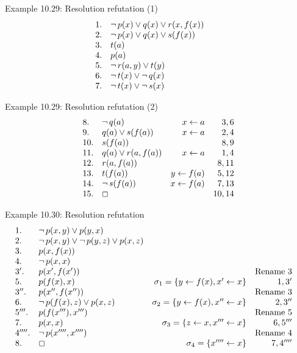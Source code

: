 \documentclass[style=simple,size=12pt]{powerdot}
\begin{document}
\begin{wideslide}[bm=,toc=]{Example 10.29: Resolution refutation (1)}
\begin{displaymath}
\begin{array}{llrr}
1.&\mathop{\neg} p(x)\vee q(x) \vee r(x,f(x))&&\\
2.&\mathop{\neg} p(x)\vee q(x) \vee s(f(x))&&\\
3.&t(a)&&\\
4.&p(a)&&\\
5.&\mathop{\neg} r(a,y)\vee t(y)&&\\
6.&\mathop{\neg} t(x)\vee \mathop{\neg} q(x)&&\\
7.&\mathop{\neg} t(x)\vee \mathop{\neg} s(x)&&
\end{array}
\end{displaymath}
\end{wideslide}

\begin{wideslide}[bm=,toc=]{Example 10.29: Resolution refutation (2)}
\begin{displaymath}
\begin{array}{llrr}
8.&\mathop{\neg} q(a)&x\leftarrow a&3,6\\
9.&q(a)\vee s(f(a))&x\leftarrow a&2,4\\
10.&s(f(a))&&8,9\\
11.&q(a)\vee r(a,f(a))&x\leftarrow a&1,4\\
12.&r(a,f(a))&&8,11\\
13.&t(f(a))&y\leftarrow f(a)&5,12\\
14.&\mathop{\neg} s(f(a))&x\leftarrow f(a)&7,13\\
15.&\Box&&10,14
\end{array}
\end{displaymath}
\end{wideslide}

\begin{wideslide}[bm=,toc=]{Example 10.30: Resolution refutation}
\vspace*{-5mm}
\begin{displaymath}
\hspace*{-4mm}
\begin{array}{llrr}
1.&\ngg p(x,y) \vee p(y,x)&&\\
2.&\ngg p(x,y) \vee \ngg p(y,z) \vee p(x,z)&&\\
3.&p(x,f(x)) &&\\
4.&\ngg p(x,x)&&\\
3'.&p(x',f(x')) &&\mathrm{Rename~} 3\\
5.&p(f(x),x)&\sigma_{1}=\{y\leftarrow f(x), x'\leftarrow x\}&1,3'\\
3''.&p(x'',f(x'')) &&\mathrm{Rename~} 3\\
6.&\ngg p(f(x),z)\vee p(x,z)&\sigma_{2}=\{y\leftarrow f(x), x''\leftarrow x\}&2,3''\\
5'''.&p(f(x'''),x''') &&\mathrm{Rename~} 5\\
7.&p(x,x)&\sigma_{3}=\{z\leftarrow x, x'''\leftarrow x\}&6,5'''\\
4''''.&\ngg p(x'''',x'''') &&\mathrm{Rename~} 4\\
8.&\Box&\sigma_{4}=\{x''''\leftarrow x\}&7,4''''
\end{array}
\end{displaymath}
\end{wideslide}
\end{document}
